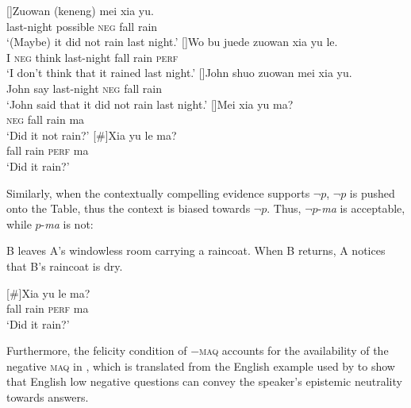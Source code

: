 \documentclass[output=paper,colorlinks,citecolor=brown]{langscibook}
\begin{document}
\ea\label{xiayune2}
\begin{xlist}
[]{\gll Zuowan (keneng) mei xia yu. \\
last-night possible \textsc{neg} fall rain \\
\glt `(Maybe) it did not rain last night.'}
[]{\gll Wo bu juede zuowan xia yu le.\\
I \textsc{neg} think last-night fall rain \textsc{perf} \\
\glt `I don't think that it rained last night.'}
[]{\gll John shuo zuowan mei xia yu. \\
John say last-night \textsc{neg} fall rain \\
\glt `John said that it did not rain last night.'}
[]{\gll Mei xia yu  ma? \\
\textsc{neg} fall rain ma \\
\glt `Did it not rain?' }
[\#]{\gll Xia yu le ma?\\
fall rain \textsc{perf} ma \\
\glt `Did it rain?'}
\end{xlist}
\z


Similarly, when the contextually compelling evidence supports $\neg p$, $\neg p$ is pushed onto the Table, thus the context is biased towards $\neg p$.  Thus,  $\neg p$-\emph{ma} is acceptable, while $p$-\emph{ma} is not:

\ea\label{qing} B leaves A's  windowless  room carrying a raincoat. When B returns, A notices that B's raincoat is dry.
\begin{xlist}
[\#]{\gll Xia yu le ma?\\
fall rain \textsc{perf} ma \\
\glt `Did it rain?'}
\end{xlist}
\z

Furthermore, the felicity condition of $-$\textsc{maq}  accounts for the availability of   the negative \textsc{maq} in , which is translated from the English  example used by \citet{Romero} to show that English low negative questions can convey the speaker's epistemic neutrality towards answers.
\end{document}
